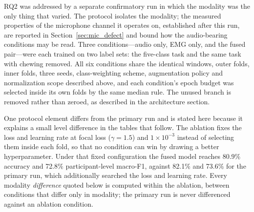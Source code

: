 \documentclass[pdflatex,sn-nature,iicol]{sn-jnl}
\begin{document}
RQ2 was addressed by a separate confirmatory run in which the modality was the only thing that varied. The protocol isolates the modality; the measured properties of the microphone channel it operates on, established after this run, are reported in Section~\ref{sec:mic_defect} and bound how the audio-bearing conditions may be read. Three conditions---audio only, EMG only, and the fused pair---were each trained on two label sets: the five-class task and the same task with chewing removed. All six conditions share the identical windows, outer folds, inner folds, three seeds, class-weighting scheme, augmentation policy and normalization scope described above, and each condition's epoch budget was selected inside its own folds by the same median rule. The unused branch is removed rather than zeroed, as described in the architecture section.

One protocol element differs from the primary run and is stated here because it explains a small level difference in the tables that follow. The ablation fixes the loss and learning rate at focal loss ($\gamma = 1.5$) and $1\times10^{-3}$ instead of selecting them inside each fold, so that no condition can win by drawing a better hyperparameter. Under that fixed configuration the fused model reaches 80.9\% accuracy and 72.8\% participant-level macro-F1, against 82.1\% and 73.6\% for the primary run, which additionally searched the loss and learning rate. Every modality \emph{difference} quoted below is computed within the ablation, between conditions that differ only in modality; the primary run is never differenced against an ablation condition.
\end{document}
